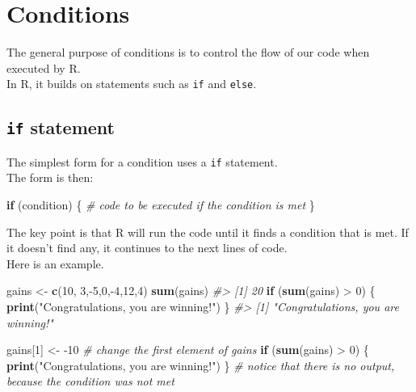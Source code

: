 \documentclass[]{book}
\newenvironment{Shaded}{}{}
\newcommand{\CommentTok}[1]{\textcolor[rgb]{0.38,0.63,0.69}{\textit{#1}}}
\newcommand{\ControlFlowTok}[1]{\textcolor[rgb]{0.00,0.44,0.13}{\textbf{#1}}}
\newcommand{\DecValTok}[1]{\textcolor[rgb]{0.25,0.63,0.44}{#1}}
\newcommand{\KeywordTok}[1]{\textcolor[rgb]{0.00,0.44,0.13}{\textbf{#1}}}
\newcommand{\NormalTok}[1]{#1}
\newcommand{\OperatorTok}[1]{\textcolor[rgb]{0.40,0.40,0.40}{#1}}
\newcommand{\StringTok}[1]{\textcolor[rgb]{0.25,0.44,0.63}{#1}}
\theoremstyle{definition}
\theoremstyle{definition}
\theoremstyle{definition}
\theoremstyle{remark}
\begin{document}
\hypertarget{conditions}{%
\chapter{Conditions}\label{conditions}}

The general purpose of conditions is to control the flow of our code
when executed by R.\\
In R, it builds on statements such as \texttt{if} and \texttt{else}.

\hypertarget{if-statement}{%
\section{\texorpdfstring{\texttt{if}
statement}{if statement}}\label{if-statement}}

The simplest form for a condition uses a \texttt{if} statement.\\
The form is then:

\begin{Shaded}
\begin{Highlighting}[]
\ControlFlowTok{if}\NormalTok{ (condition) \{}
\CommentTok{# code to be executed if the condition is met}
\NormalTok{\}}
\end{Highlighting}
\end{Shaded}

The key point is that R will run the code until it finds a condition
that is met. If it doesn't find any, it continues to the next lines of
code.\\
Here is an example.

\begin{Shaded}
\begin{Highlighting}[]
\NormalTok{gains <-}\StringTok{ }\KeywordTok{c}\NormalTok{(}\DecValTok{10}\NormalTok{, }\DecValTok{3}\NormalTok{,}\OperatorTok{-}\DecValTok{5}\NormalTok{,}\DecValTok{0}\NormalTok{,}\OperatorTok{-}\DecValTok{4}\NormalTok{,}\DecValTok{12}\NormalTok{,}\DecValTok{4}\NormalTok{)}
\KeywordTok{sum}\NormalTok{(gains)}
\CommentTok{#> [1] 20}
\ControlFlowTok{if}\NormalTok{ (}\KeywordTok{sum}\NormalTok{(gains) }\OperatorTok{>}\StringTok{ }\DecValTok{0}\NormalTok{) \{}
  \KeywordTok{print}\NormalTok{(}\StringTok{"Congratulations, you are winning!"}\NormalTok{)}
\NormalTok{\}}
\CommentTok{#> [1] "Congratulations, you are winning!"}

\NormalTok{gains[}\DecValTok{1}\NormalTok{] <-}\StringTok{ }\DecValTok{-10} \CommentTok{# change the first element of gains}
\ControlFlowTok{if}\NormalTok{ (}\KeywordTok{sum}\NormalTok{(gains) }\OperatorTok{>}\StringTok{ }\DecValTok{0}\NormalTok{) \{}
  \KeywordTok{print}\NormalTok{(}\StringTok{"Congratulations, you are winning!"}\NormalTok{)}
\NormalTok{\} }\CommentTok{# notice that there is no output, because the condition was not met}
\end{Highlighting}
\end{Shaded}
\end{document}
